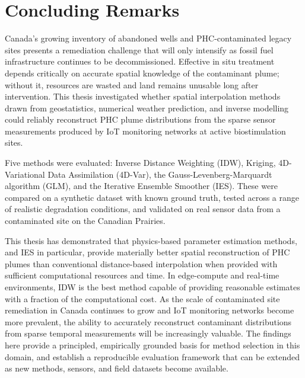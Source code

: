 \section{Concluding Remarks}

Canada's growing inventory of abandoned wells and PHC-contaminated legacy sites presents a remediation challenge that will only intensify as fossil fuel infrastructure continues to be decommissioned. Effective in situ treatment depends critically on accurate spatial knowledge of the contaminant plume; without it, resources are wasted and land remains unusable long after intervention. This thesis investigated whether spatial interpolation methods drawn from geostatistics, numerical weather prediction, and inverse modelling could reliably reconstruct PHC plume distributions from the sparse sensor measurements produced by IoT monitoring networks at active biostimulation sites.

Five methods were evaluated: Inverse Distance Weighting (IDW), Kriging, 4D-Variational Data Assimilation (4D-Var), the Gauss-Levenberg-Marquardt algorithm (GLM), and the Iterative Ensemble Smoother (IES). These were compared on a synthetic dataset with known ground truth, tested across a range of realistic degradation conditions, and validated on real sensor data from a contaminated site on the Canadian Prairies.

This thesis has demonstrated that physics-based parameter estimation methods, and IES in particular, provide materially better spatial reconstruction of PHC plumes than conventional distance-based interpolation when provided with sufficient computational resources and time. In edge-compute and real-time environments, IDW is the best method capable of providing reasonable estimates with a fraction of the computational cost. As the scale of contaminated site remediation in Canada continues to grow and IoT monitoring networks become more prevalent, the ability to accurately reconstruct contaminant distributions from sparse temporal measurements will be increasingly valuable. The findings here provide a principled, empirically grounded basis for method selection in this domain, and establish a reproducible evaluation framework that can be extended as new methods, sensors, and field datasets become available.